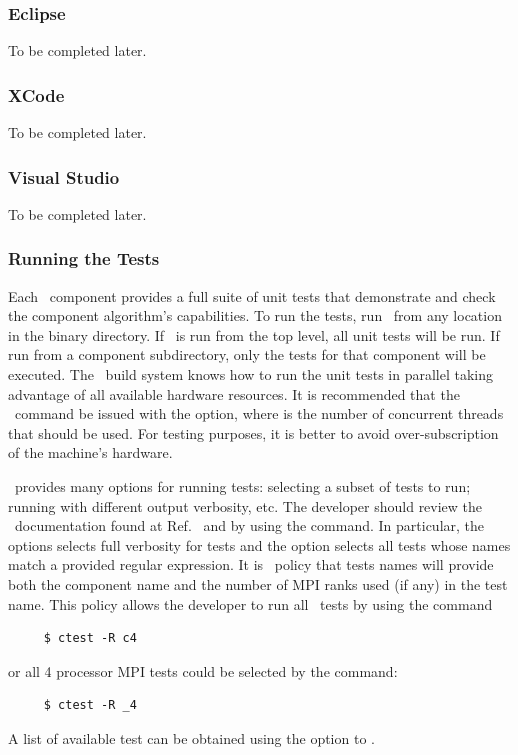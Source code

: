 \subsubsection{Eclipse}
To be completed later.

\subsubsection{XCode}
To be completed later.

\subsubsection{Visual Studio}
To be completed later.

\subsubsection{Running the Tests}

Each \draco\ component provides a full suite of unit tests that demonstrate and check the component algorithm's capabilities.  
To run the tests, run \ctest\ from any location in the binary directory.  
If \ctest\ is run from the top level, all unit tests will be run.  
If run from a component subdirectory, only the tests for that component will be executed.  
The \draco\ build system knows how to run the unit tests in parallel taking advantage of all available hardware resources.  
It is recommended that the \ctest\ command be issued with the  option, where  is the number of concurrent threads that should be used.  
For testing purposes, it is better to avoid over-subscription of the machine's hardware.

\ctest\ provides many options for running tests: selecting a subset of tests to run; running with different output verbosity, etc.  The developer should review the \ctest\ documentation found at Ref.~\cite{cmake} and by using the  command.  In particular, the  options selects full verbosity for tests and the  option selects all tests whose names match a provided regular expression.  It is \draco\ policy that tests names will provide both the component name and the number of MPI ranks used (if any) in the test name.  This policy allows the developer to run all \cfour\ tests by using the command
\begin{verbatim}
     $ ctest -R c4
\end{verbatim}
or all 4 processor MPI tests could be selected by the command:
\begin{verbatim}
     $ ctest -R _4
\end{verbatim}
A list of available test can be obtained using the  option to \ctest.

